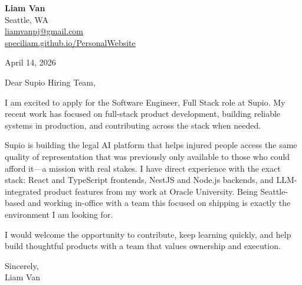 \documentclass[letterpaper,11pt]{article}
\begin{document}
\begin{flushleft}
\textbf{\Large Liam Van} \\
Seattle, WA \\
\href{mailto:liamvanpj@gmail.com}{liamvanpj@gmail.com} \\
\href{https://speciliam.github.io/PersonalWebsite}{speciliam.github.io/PersonalWebsite}
\end{flushleft}

April 14, 2026

\noindent Dear Supio Hiring Team,

\noindent I am excited to apply for the Software Engineer, Full Stack role at Supio. My recent work has focused on full-stack product development, building reliable systems in production, and contributing across the stack when needed.

\noindent Supio is building the legal AI platform that helps injured people access the same quality of representation that was previously only available to those who could afford it---a mission with real stakes. I have direct experience with the exact stack: React and TypeScript frontends, NestJS and Node.js backends, and LLM-integrated product features from my work at Oracle University. Being Seattle-based and working in-office with a team this focused on shipping is exactly the environment I am looking for.

\noindent I would welcome the opportunity to contribute, keep learning quickly, and help build thoughtful products with a team that values ownership and execution.

\noindent Sincerely, \\
Liam Van
\end{document}
